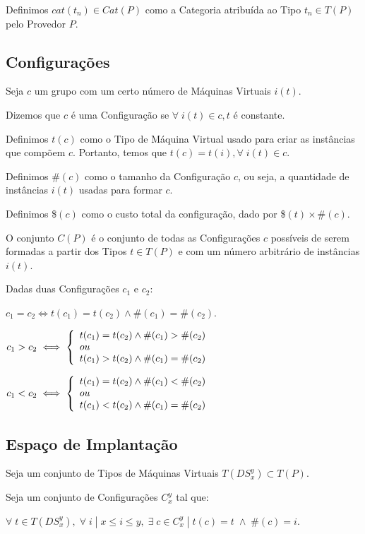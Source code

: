 Definimos $cat(t_n) \in Cat(P)$ como a Categoria atribuída ao Tipo $t_n \in T(P)$ 
pelo Provedor $P$.

\subsection{Configurações}
Seja $c$ um grupo com um certo número de Máquinas Virtuais $i(t)$.

Dizemos que $c$ é uma Configuração se $\forall \; i(t) \in c, t$ é constante.

Definimos $t(c)$ como o Tipo de Máquina Virtual usado para criar as instâncias 
que compõem $c$. Portanto, temos que $t(c) = t(i), \forall \; i(t) \in c$. 

Definimos $\#(c)$ como o tamanho da Configuração $c$, ou seja, a quantidade de 
instâncias $i(t)$ usadas para formar $c$.

Definimos \$$(c)$ como o custo total da configuração, dado por \$$(t) \times \#(c)$.

O conjunto $C(P)$ é o conjunto de todas as Configurações $c$ possíveis de serem 
formadas a partir dos Tipos $t \in T(P)$ e com um número arbitrário de instâncias 
$i(t)$.

Dadas duas Configurações $c_1$ e $c_2$:

$c_1 = c_2 \iff t(c_1) = t(c_2) \land \#(c_1) = \#(c_2)$.

$ c_1 > c_2 \iff \left\{
  \begin{array}{l l}
    t(c_1) = t(c_2) \land \#(c_1) > \#(c_2)\\
    ou\\
    t(c_1) > t(c_2) \land \#(c_1) = \#(c_2)
  \end{array} \right.$
  
$ c_1 < c_2 \iff \left\{
  \begin{array}{l l}
    t(c_1) = t(c_2) \land \#(c_1) < \#(c_2)\\
    ou\\
    t(c_1) < t(c_2) \land \#(c_1) = \#(c_2)
  \end{array} \right.$

\subsection{Espaço de Implantação}
Seja um conjunto de Tipos de Máquinas Virtuais $T(DS_x^y) \subset T(P)$.

Seja um conjunto de Configurações $C_x^y$ tal que:
 
$\forall \; t \in T(DS_x^y), \; \forall \; i \; | \; x \leq i \leq y, \; \exists \; c \in C_x^y \; | \; t(c) = t \; \land \; \#(c) = i$.
 
